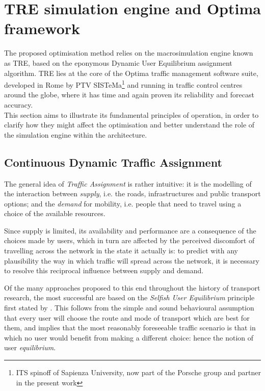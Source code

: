 \section{TRE simulation engine and Optima framework}
The proposed optimisation method relies on the macrosimulation engine known as TRE, based on the eponymous Dynamic User Equilibrium assignment algorithm.
TRE lies at the core of the Optima traffic management software suite, developed in Rome by PTV SISTeMa\footnote{ITS spinoff of Sapienza University, now part of the Porsche group and partner in the present work } and running in traffic control centres around the globe, where it has time and again proven its reliability and forecast accuracy.\\
This section aims to illustrate its fundamental principles of operation, in order to clarify how they might affect the optimisation and better understand the role of the simulation engine within the architecture.

\subsection{Continuous Dynamic Traffic Assignment}
The general idea of \emph{Traffic Assignment} is rather intuitive: it is the modelling of the interaction between \emph{supply}, i.e. the roads, infrastructures and public transport options; and the \emph{demand} for mobility, i.e. people that need to travel using a choice of the available resources.

Since supply is limited, its availability and performance are a consequence of the choices made by users, which in turn are affected by the perceived discomfort of travelling across the network in the state it actually is: to predict with any plausibility the way in which traffic will spread across the network, it is necessary to resolve this reciprocal influence between supply and demand.

Of the many approaches proposed to this end throughout the history of transport research, the most successful are based on the \emph{Selfish User Equilibrium} principle first stated by \cite{wardrop1952}. This follows from the simple and sound behavioural assumption that every user will choose the route and mode of transport which are best for them, and implies that the most reasonably foreseeable traffic scenario is that in which no user would benefit from making a different choice: hence the notion of user \emph{equilibrium}.

